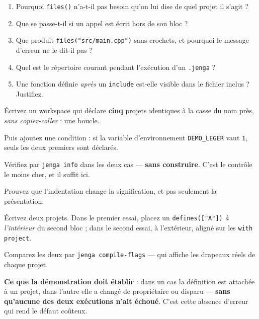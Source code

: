 \begin{nkquestions}
\begin{enumerate}
\item Pourquoi \texttt{files()} n'a-t-il pas besoin qu'on lui dise de quel projet
      il s'agit ?
\item Que se passe-t-il si un appel est écrit hors de son bloc ?
\item Que produit \texttt{files("src/main.cpp")} sans crochets, et pourquoi le
      message d'erreur ne le dit-il pas ?
\item Quel est le répertoire courant pendant l'exécution d'un \texttt{.jenga} ?
\item Une fonction définie \emph{après} un \texttt{include} est-elle visible dans
      le fichier inclus ? Justifiez.
\end{enumerate}
\end{nkquestions}

\begin{nkpratique}
Écrivez un workspace qui déclare \textbf{cinq} projets identiques à la casse du
nom près, \emph{sans copier-coller} : une boucle.

Puis ajoutez une condition : si la variable d'environnement \texttt{DEMO\_LEGER}
vaut \texttt{1}, seuls les deux premiers sont déclarés.

Vérifiez par \texttt{jenga info} dans les deux cas --- \textbf{sans construire}.
C'est le contrôle le moins cher, et il suffit ici.
\end{nkpratique}

\begin{nkdemo}
Prouvez que l'indentation change la signification, et pas seulement la
présentation.

Écrivez deux projets. Dans le premier essai, placez un \texttt{defines(["A"])}
\emph{à l'intérieur} du second bloc ; dans le second essai, à l'extérieur, aligné
sur les \texttt{with project}.

Comparez les deux par \texttt{jenga compile-flags} --- qui affiche les drapeaux
réels de chaque projet.

\textbf{Ce que la démonstration doit établir} : dans un cas la définition est
attachée à un projet, dans l'autre elle a changé de propriétaire ou disparu ---
\textbf{sans qu'aucune des deux exécutions n'ait échoué}. C'est cette absence
d'erreur qui rend le défaut coûteux.
\end{nkdemo}

